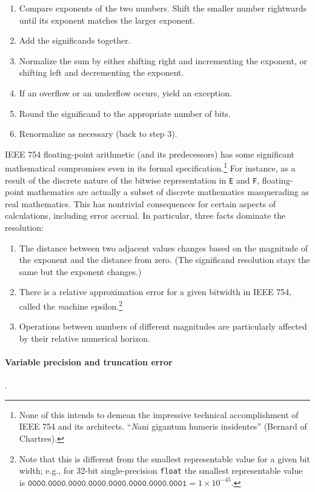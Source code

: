 \documentclass[twoside]{article}
\begin{document}
\begin{enumerate}
  \item  Compare exponents of the two numbers.  Shift the smaller number rightwards until its exponent matches the larger exponent.
  \item  Add the significands together.
  \item  Normalize the sum by either shifting right and incrementing the exponent, or shifting left and decrementing the exponent.
  \item  If an overflow or an underflow occurs, yield an exception.
  \item  Round the significand to the appropriate number of bits.
  \item  Renormalize as necessary (back to step 3).
\end{enumerate}

IEEE 754 floating-point arithmetic (and its predecessors) has some significant mathematical compromises even in its formal specification.\footnote{None of this intends to demean the impressive technical accomplishment of IEEE 754 and its architects.  “{\emph Nani gigantum humeris insidentes}” (Bernard of Chartres).}  For instance, as a result of the discrete nature of the bitwise representation in \texttt{E} and \texttt{F}, floating-point mathematics are actually a subset of discrete mathematics masquerading as real mathematics.  This has nontrivial consequences for certain aspects of calculations, including error accrual.  In particular, three facts dominate the resolution:

\begin{enumerate}
  \item  The distance between two adjacent values changes based on the magnitude of the exponent and the distance from zero.  (The significand resolution stays the same but the exponent changes.)
  \item  There is a relative approximation error for a given bitwidth in IEEE 754, called the {\emph machine epsilon}.\footnote{Note that this is different from the smallest representable value for a given bit width; e.g., for 32-bit single-precision \texttt{float} the smallest representable value is $\texttt{0000.0000.0000.0000.0000.0000.0000.0001} = 1\times 10^{-45}$.}
  \item  Operations between numbers of different magnitudes are particularly affected by their relative numerical horizon.
\end{enumerate}

\paragraph{Variable precision and truncation error}.
\end{document}
